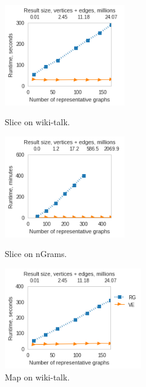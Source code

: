 \begin{figure}[!ht]
\centering
\begin{minipage}{2.1in}
\centering
\includegraphics[width=2.1in]{figs/slice_wikitalk_build13.png}
\vspace{-0.2in}
\caption{Slice on wiki-talk.}
\label{fig:slicewiki}
\vspace{-0.1in}
\end{minipage}
\begin{minipage}{2.1in}
\centering
\includegraphics[width=2.1in]{figs/slice_ngrams_build13.png}
\vspace{-0.2in}
\caption{Slice on nGrams.}
\label{fig:slicengrams}
\vspace{-0.1in}
\end{minipage}
\begin{minipage}{2.1in}
\centering
\includegraphics[width=2.4in]{figs/project_wikitalk_build13.png}
\vspace{-0.2in}
\caption{Map on wiki-talk.}
\label{fig:project}
\vspace{-0.1in}
\end{minipage}
\end{figure}

